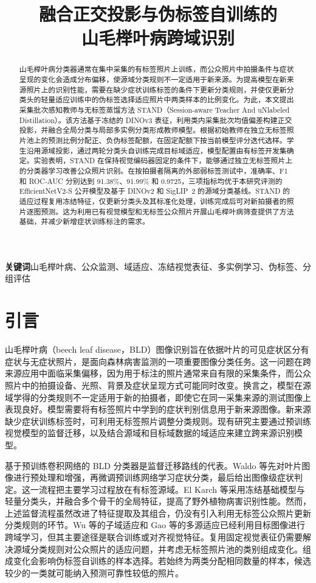 \documentclass[11pt,a4paper,UTF8,fontset=windows,scheme=plain]{ctexart}
\title{\textbf{融合正交投影与伪标签自训练的\\山毛榉叶病跨域识别}}
\author{}
\date{}
\begin{document}
\maketitle
\begin{abstract}
山毛榉叶病分类器通常在集中采集的有标签照片上训练，而公众照片中拍摄条件与症状呈现的变化会造成分布偏移，使源域分类规则不一定适用于新来源。为提高模型在新来源照片上的识别性能，需要在缺少症状训练标签的条件下更新分类规则，并使仅更新分类头的轻量适应训练中的伪标签选择适应照片中两类样本的比例变化。为此，本文提出采集批次感知教师与无标签蒸馏方法 STAND（Session-aware Teacher And uNlabeled Distillation）。该方法基于冻结的 DINOv3 表征，利用类内采集批次均值偏差构建正交投影，并融合全局分类与局部多实例分类形成教师模型。根据初始教师在独立无标签照片池上的预测比例分配正、负伪标签配额，在固定配额下按当前模型评分迭代选样。学生沿用源域投影，通过两轮分类头自训练完成目标域适应，模型配置由有标签开发集确定。实验表明，STAND 在保持视觉编码器固定的条件下，能够通过独立无标签照片上的分类器学习改善公众照片识别。在按拍摄者隔离的外部弱标签测试中，准确率、F1 和 ROC-AUC 分别达到 91.38\%、91.99\% 和 0.9725，三项指标均优于本研究评测的 EfficientNetV2-S 公开模型及基于 DINOv2 和 SigLIP~2 的源域分类基线。STAND 的适应过程复用冻结特征，仅更新分类头及其标准化处理，训练完成后可对新拍摄者的照片逐图预测。这为利用已有视觉模型和无标签公众照片开展山毛榉叶病筛查提供了方法基础，并减少新增症状训练标注的需求。
\end{abstract}
\noindent\textbf{关键词}\quad 山毛榉叶病、公众监测、域适应、冻结视觉表征、多实例学习、伪标签、分组评估

\section{引言}
\label{sec:intro}
山毛榉叶病（beech leaf disease，BLD）图像识别旨在依据叶片的可见症状区分有症状与无症状照片，是面向森林病害监测的一项重要图像分类任务\cite{waldo2026}。这一问题在跨来源应用中面临采集偏移，因为用于标注的照片通常来自有限的采集条件，而公众照片中的拍摄设备、光照、背景及症状呈现方式可能同时改变。换言之，模型在源域学得的分类规则不一定适用于新的拍摄者，即使它在同一采集来源的测试图像上表现良好。模型需要将有标签照片中学到的症状判别信息用于新来源图像。新来源缺少症状训练标签时，可利用无标签照片调整分类规则。现有研究主要通过预训练视觉模型的监督迁移，以及结合源域和目标域数据的域适应来建立跨来源识别模型\cite{waldo2026,wu2023,gao2024}。

基于预训练卷积网络的 BLD 分类器是监督迁移路线的代表。Waldo 等先对叶片图像进行预处理和增强，再微调预训练网络学习症状分类，最后给出图像级症状判定\cite{waldo2026}。这一流程把主要学习过程放在有标签源域。El Karch 等采用冻结基础模型与轻量分类头，并融合多个骨干的全局特征，提高了野外植物病害识别性能\cite{elkarch2026}。然而，上述监督流程虽然改进了特征提取及其组合，仍没有引入利用无标签公众照片更新分类规则的环节。Wu 等的子域适应和 Gao 等的多源适应已经利用目标图像进行跨域学习，但其主要途径是联合训练或对齐视觉特征\cite{wu2023,gao2024}。复用固定视觉表征仍需要解决源域分类规则对公众照片的适应问题，并考虑无标签照片池的类别组成变化。组成变化会影响伪标签自训练的样本选择。若始终为两类分配相同数量的样本，候选较少的一类就可能纳入预测可靠性较低的照片。
\end{document}
